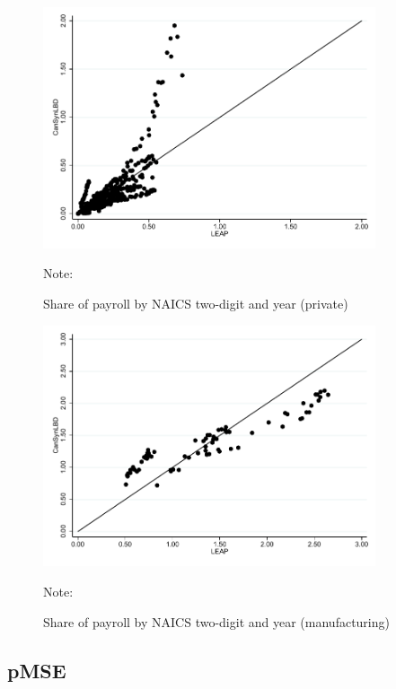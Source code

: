 \begin{figure} [H]
\centering
\caption{Share of payroll by NAICS two-digit and year (private)} \label{PayrollSharePrivate}
\includegraphics[height=2.8in, width=.7\linewidth]{graphs/Share_of_payroll_by_NAICS_two-digit_and_year_private_bw.pdf} 
\begin{minipage}{0.85\textwidth}
{\footnotesize Note: \TableNote \par}
\end{minipage}
\end{figure}
\vspace{-15.5pt}
\begin{figure} [H]
\centering
\caption{Share of payroll by NAICS two-digit and year (manufacturing)} \label{PayrollShareManufacturing}
\includegraphics[height=2.8in, width=.7\linewidth]{graphs/Share_of_payroll_by_NAICS_two-digit_and_year_Manufacturing_bw.pdf} 
\begin{minipage}{0.85\textwidth}
{\footnotesize Note: \TableNote \par}
\end{minipage}
\end{figure}

\subsection{pMSE}


